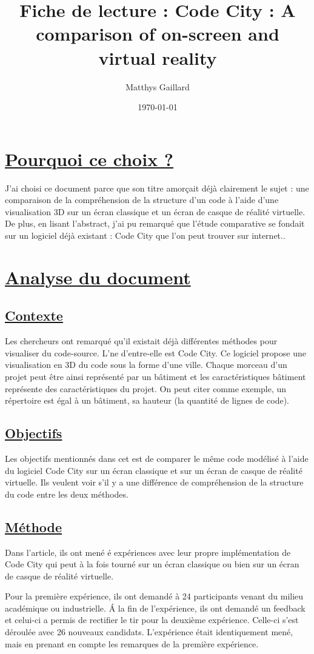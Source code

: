 \documentclass[a4paper,10pt, oneside]{article}
\title{Fiche de lecture : Code City : A comparison of on-screen and virtual reality}
\author{Matthys Gaillard}
\date{\today}
\begin{document}
\maketitle
\section{\ul{Pourquoi ce choix ?}}
		\par J'ai choisi ce document parce que son titre amorçait déjà clairement le sujet\cite{A2} : une comparaison de la compréhension de la 
		structure d'un code à l'aide d'une visualisation 3D sur un écran classique et un écran de casque de réalité virtuelle. De plus, en lisant l'abstract,
		j'ai pu remarqué que l'étude comparative se fondait sur un logiciel déjà existant : Code City que l'on peut trouver sur internet..
\section{\ul{Analyse du document}}
\subsection{\ul{Contexte}}
		\par Les chercheurs ont remarqué qu'il existait déjà différentes méthodes pour visualiser du code-source. L'ne d'entre-elle est Code City. Ce logiciel
		propose une visualisation en 3D du code sous la forme d'une ville. Chaque morceau d'un projet peut être ainsi représenté par un bâtiment et les caractéristiques
		bâtiment représente des caractéristiques du projet. On peut citer comme exemple, un répertoire est égal à un bâtiment, sa hauteur (la quantité de lignes de code).
\subsection{\ul{Objectifs}}
		\par Les objectifs mentionnés dans cet est de comparer le même code modélisé à l'aide du logiciel Code City sur un écran classique et sur un écran de casque de réalité virtuelle.
		Ils veulent voir s'il y a une différence de compréhension de la structure du code entre les deux méthodes.
\subsection{\ul{Méthode}}
		\par Dans l'article, ils ont mené é expériences avec leur propre implémentation de Code City qui peut à la fois tourné sur un écran classique ou bien sur un écran de casque de réalité virtuelle.
		\par Pour la première expérience, ils ont demandé à 24 participants venant du milieu académique ou industrielle. Á la fin de l'expérience, ils ont demandé un feedback et celui-ci a permis de rectifier le tir 
		pour la deuxième expérience. Celle-ci s'est déroulée avec 26 nouveaux candidats. L'expérience était identiquement mené, mais en prenant en compte les remarques de la première expérience.
\end{document}
